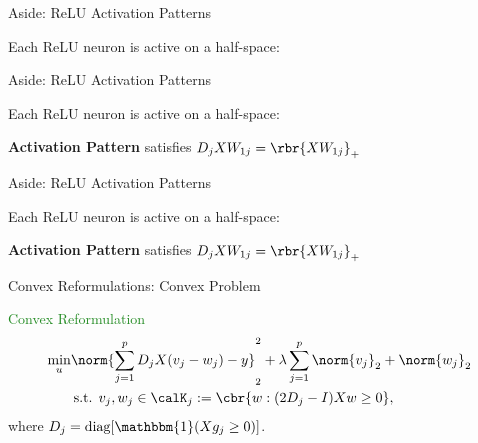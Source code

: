 \documentclass[usenames,dvipsnames,mathserif,notheorems]{beamer}
\begin{document}
\begin{frame}{Aside: ReLU Activation Patterns}

	Each ReLU neuron is active on a half-space:

	\pause

	\begin{figure}[]
		\centering
		
	\end{figure}


\end{frame}

\begin{frame}{Aside: ReLU Activation Patterns}

	Each ReLU neuron is active on a half-space:

	\begin{figure}[]
		\centering
		
	\end{figure}

	\pause
	\textbf{Activation Pattern} satisfies \( D_j X W_{1j} = \rbr{X W_{1j}}_+ \)

\end{frame}

\begin{frame}{Aside: ReLU Activation Patterns}

	Each ReLU neuron is active on a half-space:

	\begin{figure}[]
		\centering
		
	\end{figure}


	\textbf{Activation Pattern} satisfies \( D_j X W_{1j} = \rbr{X W_{1j}}_+ \)

\end{frame}


\begin{frame}{Convex Reformulations: Convex Problem}

	{\large \textcolor{ForestGreen}{Convex Reformulation}} \citep{pilanci2020convex}
	\[
		\begin{aligned}
			\min_{u} & \norm{\sum_{j=1}^p D_j X (v_j - w_j) - y}_2^2 +
			\lambda \sum_{j=1}^p \norm{v_j}_2 + \norm{w_j}_2           \\
			         & \hspace{0.2em} \text{s.t. }
			v_j, w_j \in \calK_j := \cbr{w : (2D_j - I) X w \geq 0},
		\end{aligned}
	\]
	where \( D_j = \text{diag}[\mathbbm{1}(X g_j \geq 0)] \).
	\pause

	\begin{figure}[]
		\centering
		
	\end{figure}
\end{frame}
\end{document}
